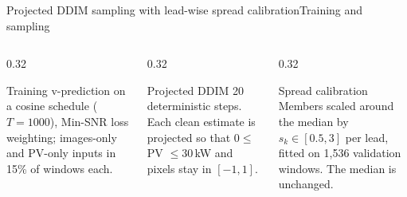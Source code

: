 \documentclass[aspectratio=169,11pt]{beamer}
\begin{document}
\begin{frame}{Projected DDIM sampling with lead-wise spread calibration}{Training and sampling}
\begin{columns}[T]
\begin{column}{0.32\textwidth}
\begin{navycard}{Training}\small
v-prediction on a cosine schedule ($T=1000$), Min-SNR loss weighting; images-only and PV-only inputs in 15\% of windows each.
\end{navycard}
\end{column}
\begin{column}{0.32\textwidth}
\begin{navycard}{Projected DDIM}\small
20 deterministic steps. Each clean estimate is projected so that $0\le$ PV $\le 30$\,kW and pixels stay in $[-1,1]$.
\end{navycard}
\end{column}
\begin{column}{0.32\textwidth}
\begin{goldcard}{Spread calibration}\small
Members scaled around the median by $s_k\in[0.5,3]$ per lead, fitted on 1{,}536 validation windows. The median is unchanged.
\end{goldcard}
\end{column}
\end{columns}
\end{frame}
\end{document}

